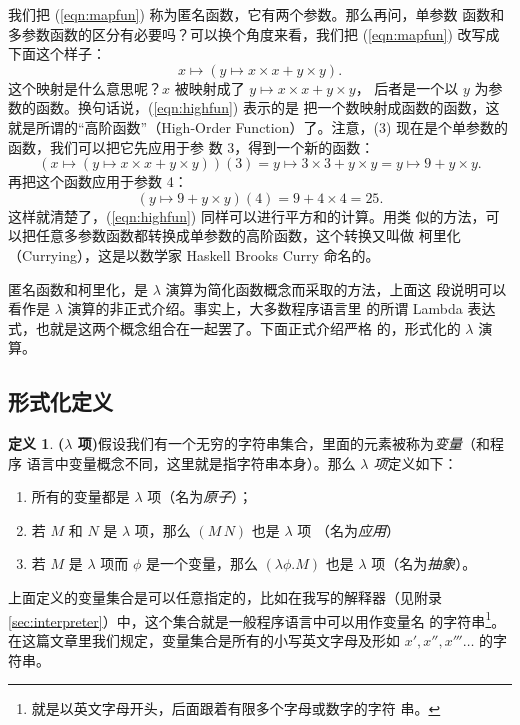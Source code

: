 \documentclass[a4paper,adobefonts]{ctexart}
\newenvironment{tightenum}{
  \begin{enumerate}
    \setlength{\itemindent}{2\ccwd}
    \setlength{\itemsep}{0cm}
    \setlength{\parskip}{0cm}
}{
  \end{enumerate}
}
\theoremstyle{definition}
\newtheorem{definition}{定义}
\begin{document}
我们把 (\ref{eqn:mapfun}) 称为匿名函数，它有两个参数。那么再问，单参数
函数和多参数函数的区分有必要吗？可以换个角度来看，我们把
(\ref{eqn:mapfun}) 改写成下面这个样子：
\begin{equation}\label{eqn:highfun}
  x\mapsto(y\mapsto x\times x + y \times y).
\end{equation}
这个映射是什么意思呢？$x$ 被映射成了 $y\mapsto x\times x + y \times y$，
后者是一个以 $y$ 为参数的函数。换句话说，(\ref{eqn:highfun}) 表示的是
把一个数映射成函数的函数，这就是所谓的``高阶函数''（High-Order
  Function）了。注意，(3) 现在是个单参数的函数，我们可以把它先应用于参
数 3，得到一个新的函数：
$$
(x\mapsto(y\mapsto x\times x + y \times y))(3)
=y\mapsto 3\times 3 + y \times y = y\mapsto 9 + y \times y.
$$
再把这个函数应用于参数 4：
$$
(y\mapsto 9 + y \times y)(4)=9+4\times 4=25.
$$这样就清楚了，(\ref{eqn:highfun}) 同样可以进行平方和的计算。用类
似的方法，可以把任意多参数函数都转换成单参数的高阶函数，这个转换又叫做
柯里化（Currying），这是以数学家 Haskell Brooks Curry 命名的。

匿名函数和柯里化，是 $\lambda$ 演算为简化函数概念而采取的方法，上面这
段说明可以看作是 $\lambda$ 演算的非正式介绍。事实上，大多数程序语言里
的所谓 Lambda 表达式，也就是这两个概念组合在一起罢了。下面正式介绍严格
的，形式化的 $\lambda$ 演算。

\subsection{形式化定义}\label{subsec:formal}
\begin{definition}{\bfseries{($\lambda$ 项)}}\label{def:lambdaterm}
  假设我们有一个无穷的字符串集合，里面的元素被称为\emph{变量}（和程序
    语言中变量概念不同，这里就是指字符串本身）。那么 \emph{$\lambda$ 项}定义如下：
  \begin{tightenum}
  \item 所有的变量都是 $\lambda$ 项（名为\emph{原子}）；
  \item 若 $M$ 和 $N$ 是 $\lambda$ 项，那么 $(M\,N)$ 也是 $\lambda$ 项
    （名为\emph{应用}）
  \item 若 $M$ 是 $\lambda$ 项而 $\phi$ 是一个变量，那么 $(\lambda\phi.M)$
    也是 $\lambda$ 项（名为\emph{抽象}）。
  \end{tightenum}
\end{definition}

上面定义的变量集合是可以任意指定的，比如在我写的解释器（见附录
  \ref{sec:interpreter}）中，这个集合就是一般程序语言中可以用作变量名
的字符串\footnote{就是以英文字母开头，后面跟着有限多个字母或数字的字符
  串。}。在这篇文章里我们规定，变量集合是所有的小写英文字母及形如
$x',x'',x'''\dots$ 的字符串。
\end{document}
